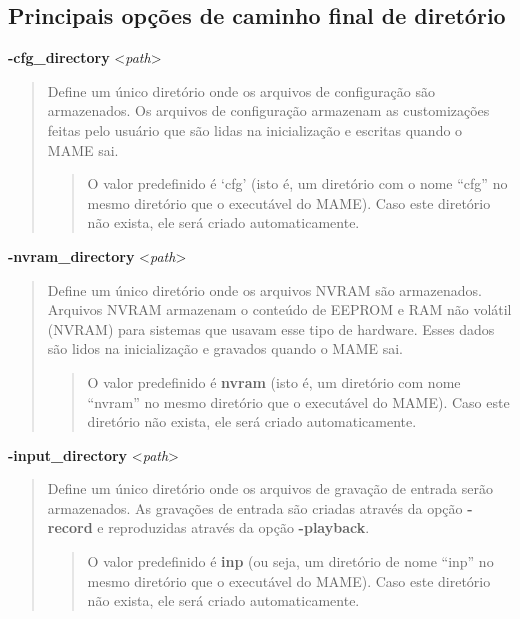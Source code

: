 \documentclass[letterpaper,10pt,brazil]{sphinxmanual}
\begin{document}
\subsection{Principais opções de caminho final de diretório}
\label{commandline/commandline-all:principais-opcoes-de-caminho-final-de-diretorio}\label{commandline/commandline-all:mame-commandline-cfgdirectory}
\textbf{-cfg\_directory} \textless{}\emph{path}\textgreater{}
\begin{quote}

Define um único diretório onde os arquivos de configuração
são armazenados. Os arquivos de configuração armazenam as
customizações feitas pelo usuário que são lidas na inicialização e
escritas quando o MAME sai.
\begin{quote}

O valor predefinido é `cfg' (isto é, um diretório com o nome
``cfg'' no mesmo diretório que o executável do MAME). Caso este
diretório não exista, ele será criado automaticamente.
\end{quote}
\end{quote}
\label{commandline/commandline-all:mame-commandline-nvramdirectory}
\textbf{-nvram\_directory} \textless{}\emph{path}\textgreater{}
\begin{quote}

Define um único diretório onde os arquivos NVRAM são
armazenados. Arquivos NVRAM armazenam o conteúdo de EEPROM e RAM não
volátil (NVRAM) para sistemas que usavam esse tipo de hardware.
Esses dados são lidos na inicialização e gravados quando o MAME sai.
\begin{quote}

O valor predefinido é \textbf{nvram} (isto é, um diretório com nome
``nvram'' no mesmo diretório que o executável do MAME).
Caso este diretório não exista, ele será criado automaticamente.
\end{quote}
\end{quote}
\label{commandline/commandline-all:mame-commandline-inputdirectory}
\textbf{-input\_directory} \textless{}\emph{path}\textgreater{}
\begin{quote}

Define um único diretório onde os arquivos de gravação de entrada
serão armazenados. As gravações de entrada são criadas através da
opção \textbf{-record} e reproduzidas através da opção \textbf{-playback}.
\begin{quote}

O valor predefinido é \textbf{inp} (ou seja, um diretório de nome
``inp'' no mesmo diretório que o executável do MAME). Caso este
diretório não exista, ele será criado automaticamente.
\end{quote}
\end{quote}
\end{document}
